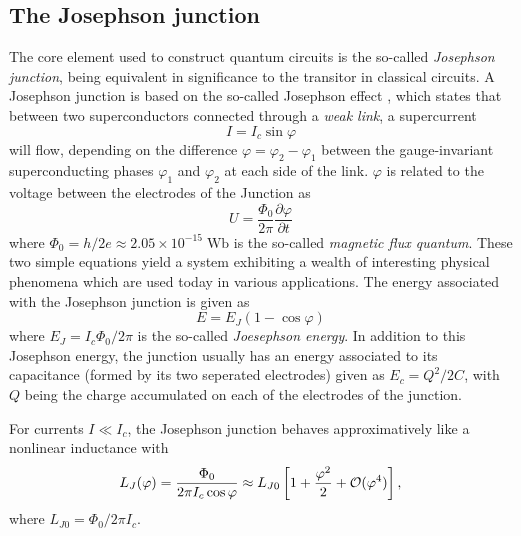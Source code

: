 \subsection{The Josephson junction}

The core element used to construct quantum circuits is the so-called {\it Josephson junction}, being equivalent in significance to the transitor in classical circuits. A Josephson junction is based on the so-called Josephson effect \citep{josephson_possible_1962}, which states that between two superconductors connected through a {\it weak link}, a supercurrent
%
\begin{equation}
I = I_c\sin{\varphi}
\end{equation}
%
will flow, depending on the difference $\varphi = \varphi_2-\varphi_1$ between the gauge-invariant superconducting phases $\varphi_1$ and $\varphi_2$ at each side of the link. $\varphi$ is related to the voltage between the electrodes of the Junction as
%
\begin{equation}
U = \frac{\Phi_0}{2\pi}\frac{\partial \varphi}{\partial t}
\end{equation}
%
where $\Phi_0 =h/2e \approx 2.05\times 10^{-15}\;\mathrm{Wb}$ is the so-called {\it magnetic flux quantum}. These two simple equations yield a system exhibiting a  wealth of interesting physical phenomena which are used today in various applications. The energy associated with the Josephson junction is given as
%
\begin{equation}
E = E_J(1-\cos{\varphi})
\end{equation}
%
where $E_J = I_c \Phi_0/2\pi$ is the so-called {\it Joesephson energy}. In addition to this Josephson energy, the junction usually has an energy associated to its capacitance (formed by its two seperated electrodes) given as $E_c = Q^2/2C$, with $Q$ being the charge accumulated on each of the electrodes of the junction.

\smallskip

For currents $I\ll I_c$, the Josephson junction behaves approximatively like a nonlinear inductance with
%
\begin{equation}
L_J(\varphi) = \frac{\Phi_0}{2\pi I_c \cos{\varphi}} \approx L_{J0}\left[1+\frac{\varphi^2}{2}+\begin{mathcal}O\end{mathcal}(\varphi^4)\right],\label{eq:josephson_inductance}
\end{equation}
%
where $L_{J0}=\Phi_0/2\pi I_c$. 

\smallskip

